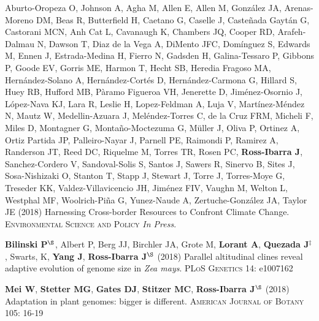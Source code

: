 \documentclass[letterpaper,10pt]{article}
\begin{document}
\begin{etaremune}
\item  Aburto-Oropeza O, Johnson A, Agha M, Allen E,  Allen M,  Gonz\'{a}lez JA, Arenas-Moreno DM, Beas R, Butterfield H, Caetano G, Caselle J, Caste\~{n}ada Gayt\'{a}n G, Castorani MCN, Anh Cat L, Cavanaugh K, Chambers JQ, Cooper RD, Arafeh-Dalmau N, Dawson T, Diaz de la Vega A, DiMento JFC, Dom\'{i}nguez S, Edwards M, Ennen J, Estrada-Medina H, Fierro N, Gadsden H, Galina-Tessaro P, Gibbons P, Goode EV, Gorris ME, Harmon T, Hecht SB, Heredia Fragoso MA, Hern\'{a}ndez-Solano A, Hern\'{a}ndez-Cort\'{e}s D, Hern\'{a}ndez-Carmona G, Hillard S, Huey RB, Hufford MB, P\`{a}ramo Figueroa VH, Jenerette D, Jim\'{e}nez-Osornio J, L\'{o}pez-Nava KJ, Lara R, Leslie H, Lopez-Feldman A, Luja V, Mart\'{i}nez-M\'{e}ndez N, Mautz W, Medellin-Azuara J, Mel\'{e}ndez-Torres C, de la Cruz FRM,  Micheli F, Miles D, Montagner G, Monta\~{n}o-Moctezuma G, M\"{u}ller J, Oliva P, Ortinez A, Ortiz Partida JP, Palleiro-Nayar J, Parnell PE, Raimondi P, Ramirez A, Randerson JT, Reed DC, Riquelme M, Torres TR, Rosen PC, {\bf Ross-Ibarra J}, Sanchez-Cordero V, Sandoval-Solis S, Santos J, Sawers R, Sinervo B, Sites J,  Sosa-Nishizaki O, Stanton T, Stapp J, Stewart J, Torre J,  Torres-Moye G, Treseder KK, Valdez-Villavicencio JH, Jim\'{e}nez FIV, Vaughn M, Welton L, Westphal MF, Woolrich-Pi\~{n}a G,  Yunez-Naude A, Zertuche-Gonz\'{a}lez JA, Taylor JE (2018)
Harnessing Cross-border Resources to Confront Climate Change.  \textsc{Environmental Science and Policy} \textit{In Press}.

\item \textbf{Bilinski P}$^\S$, Albert P, Berg JJ, Birchler JA, Grote M, \textbf{Lorant A}, \textbf{Quezada J}$^\ddagger$, Swarts, K, \textbf{Yang J}, \textbf{Ross-Ibarra J}$^\S$ (2018) Parallel altitudinal clines reveal adaptive evolution of genome size in \textit{Zea mays}. \textsc{PLoS Genetics} 14: e1007162

\item {\bf Mei W}, {\bf Stetter MG}, {\bf Gates DJ}, {\bf Stitzer MC}, {\bf Ross-Ibarra J}$^\S$ (2018) Adaptation in plant genomes: bigger is different.  \textsc{American Journal of Botany} 105: 16-19


\end{etaremune}
\end{document}
